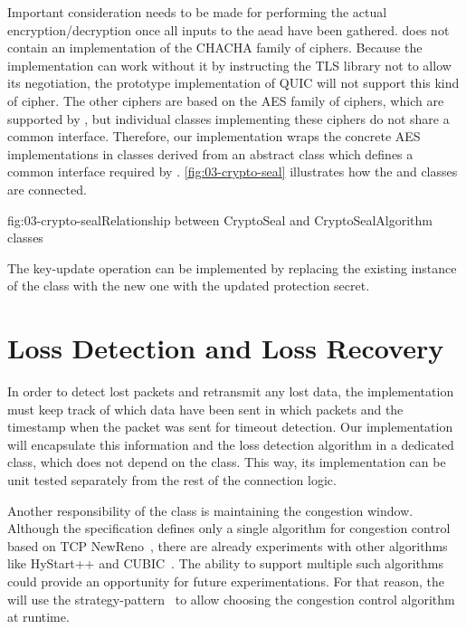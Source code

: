 Important consideration needs to be made for performing the actual encryption/decryption once all
inputs to the \gls{aead} have been gathered. \dotnet{} does not contain an implementation of the
CHACHA family of ciphers. Because the implementation can work without it by instructing the TLS
library not to allow its negotiation, the prototype implementation of QUIC will not support this
kind of cipher. The other ciphers are based on the AES family of ciphers, which are supported by
\dotnet{}, but individual classes implementing these ciphers do not share a common interface.
Therefore, our implementation wraps the concrete AES implementations in classes derived from an
abstract  class which defines a common interface required by
\CryptoSeal{}. \autoref{fig:03-crypto-seal} illustrates how the \CryptoSeal{} and
 classes are connected.

\begin{myFigure}{fig:03-crypto-seal}{Relationship between CryptoSeal and CryptoSealAlgorithm
classes}

  \resizebox{\linewidth}{!}{}

\end{myFigure}

The \gls{key-update} operation can be implemented by replacing the existing instance of the
\CryptoSeal{} class with the new one with the updated protection secret.

\section{Loss Detection and Loss Recovery}

In order to detect lost packets and retransmit any lost data, the \QuicConnection{} implementation
must keep track of which data have been sent in which packets and the timestamp when the packet was
sent for timeout detection. Our implementation will encapsulate this information and the loss
detection algorithm in a dedicated \RecoveryController{} class, which does not depend on the
\QuicConnection{} class. This way, its implementation can be unit tested separately from the rest of
the connection logic.

Another responsibility of the \RecoveryController{} class is maintaining the congestion window.
Although the specification defines only a single algorithm for congestion control based on TCP
NewReno~\autocite[Section~7]{draft-ietf-quic-recovery}, there are already experiments with other
algorithms like HyStart++ and CUBIC~\cite{cloudflareCubic}. The ability to support multiple such
algorithms could provide an opportunity for future experimentations. For that reason, the
\RecoveryController{} will use the \gls{strategy-pattern}~\cite{wiki:strategy-pattern} to allow
choosing the congestion control algorithm at runtime.

